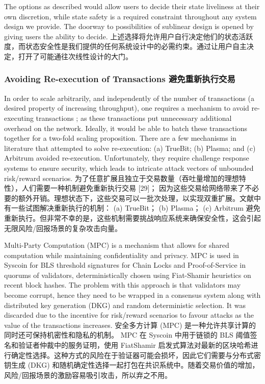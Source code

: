 \documentclass{ctexart}
\begin{document}
The options as described would allow users to decide their state liveliness at their own discretion, while state safety is a required constraint throughout any system design we provide. The doorway to possibilities of sublinear design is opened by giving users the ability to decide. 上述选择将允许用户自行决定他们的状态活跃度，而状态安全性是我们提供的任何系统设计中的必需约束。通过让用户自主决定，打开了可能通往次线性设计的大门。


\subsubsection{Avoiding Re-execution of Transactions 避免重新执行交易}

In order to scale arbitrarily, and independently of the number of transactions (a desired property of increasing throughput), one requires a mechanism to avoid re-executing transactions \cite{Bow18}; as these transactions put unnecessary additional overhead on the network. Ideally, it would be able to batch these transactions together for a two-fold scaling proposition. There are a few mechanisms in literature that attempted to solve re-execution: (a) TrueBit; (b) Plasma; and (c) Arbitrum avoided re-execution. Unfortunately, they require challenge response systems to ensure security, which leads to intricate attack vectors of unbounded risk/reward scenarios.  为了任意扩展且独立于交易数量（吞吐量增加的理想特性），人们需要一种机制避免重新执行交易 [29]； 因为这些交易给网络带来了不必要的额外开销。理想状态下，这些交易可以一批次处理，以实现双重扩展。文献中有一些试图解决重新执行的机制： (a) TrueBit； (b) Plasma； (c) Arbitrum 避免重新执行。但非常不幸的是，这些机制需要挑战响应系统来确保安全性，这会引起无限风险/回报场景的复杂攻击向量。

Multi-Party Computation (MPC) is a mechanism that allows for shared computation while maintaining confidentiality and privacy. MPC is used in Syscoin for BLS threshold signatures for Chain Locks and Proof-of-Service in quorums of validators, deterministically chosen using Fiat-Shamir heuristics on recent block hashes. The problem with this approach is that validators may become corrupt, hence they need to be wrapped in a consensus system along with distributed key generation (DKG) and random deterministic selection. It was discarded due to the incentive for risk/reward scenarios to favour attacks as the value of the transactions increases. 安全多方计算 (MPC) 是一种允许共享计算的同时还可保持机密性和隐私的机制。 MPC 在 Syscoin 中用于链锁的 BLS 阈值签名和验证者仲裁中的服务证明，使用 FiatShamir 启发式算法对最新的区块哈希进行确定性选择。这种方式的风险在于验证器可能会损坏，因此它们需要与分布式密钥生成 (DKG) 和随机确定性选择一起打包在共识系统中。随着交易价值的增加，风险/回报场景的激励容易吸引攻击，所以弃之不用。
\end{document}
